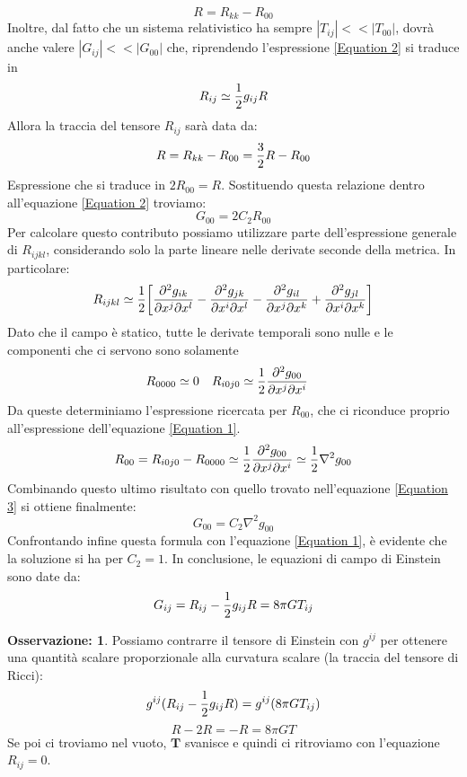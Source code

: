 \documentclass[]{report}
\theoremstyle{definition}
\theoremstyle{Theorem}
\theoremstyle{definition}
\theoremstyle{definition}
\theoremstyle{definition}
\newtheorem{Obs}[Def]{Osservazione:}
\begin{document}
$$R=R_{kk}-R_{00}$$
Inoltre, dal fatto che un sistema relativistico ha sempre $|T_{ij}|<<|T_{00}|$, dovrà anche valere $|G_{ij}|<<|G_{00}|$ che, riprendendo l'espressione \ref{Equation 2} si traduce in
$$R_{ij}\simeq{1\over 2}g_{ij}R$$
Allora la traccia del tensore $R_{ij}$ sarà data da:
$$R=R_{kk}-R_{00}={3\over 2}R-R_{00}$$
Espressione che si traduce in $2R_{00}=R$. Sostituendo questa relazione dentro all'equazione \ref{Equation 2} troviamo:
\begin{equation}
	\label{Equation 3}
	G_{00}=2C_2R_{00}
\end{equation} 
Per calcolare questo contributo possiamo utilizzare parte dell'espressione generale di $R_{ijkl}$, considerando solo la parte lineare nelle derivate seconde della metrica. In particolare:
$$R_{ijkl}\simeq{1\over 2}\bigg{[}{\partial^2 g_{ik} \over\partial x^j\partial x^l}-{\partial^2 g_{jk}\over\partial x^i\partial x^l}-{\partial^2 g_{il} \over\partial x^j\partial x^k}+{\partial^2 g_{jl}\over\partial x^i\partial x^k}\bigg{]}$$
Dato che il campo è statico, tutte le derivate temporali sono nulle e le componenti che ci servono sono solamente
\begin{align*}
	R_{0000}&\simeq 0 & R_{i0j0}&\simeq {1\over 2} {\partial^2 g_{00} \over\partial x^j\partial x^i}  
\end{align*}
Da queste determiniamo l'espressione ricercata per $R_{00}$, che ci riconduce proprio all'espressione dell'equazione \ref{Equation 1}.
$$R_{00}=R_{i0j0}-R_{0000}\simeq {1\over 2} {\partial^2 g_{00} \over\partial x^j\partial x^i}\simeq {1\over 2} \nabla^2 g_{00}$$
Combinando questo ultimo risultato con quello trovato nell'equazione \ref{Equation 3} si ottiene finalmente:
$$G_{00}=C_2\nabla^2g_{00}$$
Confrontando infine questa formula con l'equazione \ref{Equation 1}, è evidente che la soluzione si ha per $C_2=1$. In conclusione, le equazioni di campo di Einstein sono date da:
$$G_{ij}=R_{ij}-{1\over 2}g_{ij}R=8\pi GT_{ij}$$
\begin{Obs}
	Possiamo contrarre il tensore di Einstein con $g^{ij}$ per ottenere una quantità scalare proporzionale alla curvatura scalare (la traccia del tensore di Ricci):
	$$g^{ij}(R_{ij}-{1\over 2}g_{ij}R)=g^{ij}(8\pi GT_{ij})$$
	$$R-2R=-R=8\pi GT$$
	Se poi ci troviamo nel vuoto, $\textbf{T}$ svanisce e quindi ci ritroviamo con l'equazione $R_{ij}=0$.
\end{Obs}
\end{document}
